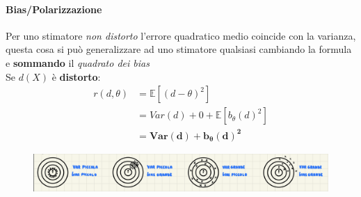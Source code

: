 \documentclass[]{article}
\newcommand{\ev}{\mathbb{E}[X]}
\renewcommand{\ev}[1]{\mathbb{E}\left[#1\right]}
\begin{document}
    \paragraph{Bias/Polarizzazione} Per uno stimatore \textit{non distorto} l'errore quadratico medio coincide con la varianza, questa cosa si può generalizzare ad uno stimatore qualsiasi cambiando la formula e \textbf{sommando} il \textit{quadrato dei bias} \\
    Se $d(X)$ è \textbf{distorto}:
    \begin{equation*}
        \begin{split}
            r(d, \theta) &= \ev{(d - \theta)^2} \\
            &= Var(d) + 0 + \ev{b_\theta (d)^2} \\
            &= \boldsymbol{Var(d) + b_\theta(d)^2}
        \end{split}
    \end{equation*}
    \begin{figure}[h]
        \includegraphics[width=\textwidth]{images/boh_4.png}    
    \end{figure}
\end{document}
